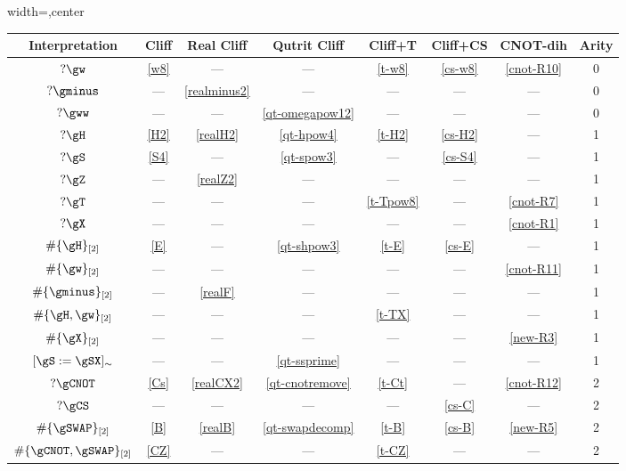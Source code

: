 \begin{figure}[ht]
    \begin{threeparttable}
    \begin{adjustbox}{width=\textwidth,center}
    \renewcommand{\arraystretch}{1.2}
    \begin{tabular}{|c|c|c|c|c|c|c|c|}
    \hline
    \textbf{Interpretation} & \textbf{Cliff} & \textbf{Real Cliff} & \textbf{Qutrit Cliff} & \textbf{Cliff+T} & \textbf{Cliff+CS} & \textbf{CNOT-dih} &  \textbf{Arity} \\
    \hline
    $?\gw$ & \eqref{w8} & — & — & \eqref{t-w8}  & \eqref{cs-w8} & \eqref{cnot-R10} & 0\\
    $?\gminus$ & — & \eqref{realminus2} & — & —  & — & — & 0\\
    $?\gww$ & — & — & \eqref{qt-omegapow12} & —  & — & — & 0\\
    \hline
    $?\gH$ & \eqref{H2} & \eqref{realH2} & \eqref{qt-hpow4} & \eqref{t-H2}  & \eqref{cs-H2} & — & 1 \\
    $?\gS$ & \eqref{S4} & — & \eqref{qt-spow3} & — & \eqref{cs-S4} & — & 1 \\
    $?\gZ$ & — & \eqref{realZ2} & — & — & — & — & 1 \\
    $?\gT$ & — & — & — & \eqref{t-Tpow8} & — & \eqref{cnot-R7} & 1 \\
    $?\gX$ & — & — & — & — & — & \eqref{cnot-R1} & 1 \\
    $\#\{\gH\}_{[2]}$ & \eqref{E} & — & \eqref{qt-shpow3} & \eqref{t-E} & \eqref{cs-E} & — & 1 \\
    $\#\{\gw\}_{[2]}$ & — & — & — & — & — & \eqref{cnot-R11} & 1 \\
    $\#\{\gminus\}_{[2]}$ & — & \eqref{realF} & — & — & — & — & 1 \\
    $\#\{\gH, \gw\}_{[2]}$ & — & — & — & \eqref{t-TX} & — & — & 1 \\
    $\#\{\gX\}_{[2]}$ & — & — & — & — & — & \eqref{new-R3} & 1 \\
    $[\gS:=\gSX]_{\sim}$ & — & — & \eqref{qt-ssprime}\tnote{a} & — & — & — & 1 \\
    \hline
    $?\gCNOT$ & \eqref{Cs} & \eqref{realCX2} & \eqref{qt-cnotremove} & \eqref{t-Ct} & — & \eqref{cnot-R12} & 2 \\
    $?\gCS$ & — & — & — & — & \eqref{cs-C} & — & 2 \\
    $\#\{\gSWAP\}_{[2]}$ & \eqref{B} & \eqref{realB} & \eqref{qt-swapdecomp} & \eqref{t-B} & \eqref{cs-B} & \eqref{new-R5} & 2 \\
    $\#\{\gCNOT,\gSWAP\}_{[2]}$ & \eqref{CZ} & —  & — & \eqref{t-CZ} & — & — & 2 \\

\end{tabular}
\end{adjustbox}
\end{threeparttable}
\end{figure}
